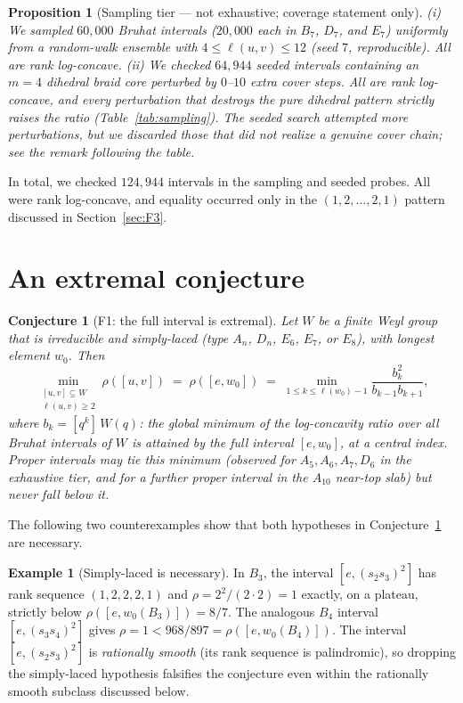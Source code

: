 \documentclass[11pt]{amsart}
\theoremstyle{plain}
\newtheorem{proposition}[theorem]{Proposition}
\newtheorem{conjecture}[theorem]{Conjecture}
\theoremstyle{definition}
\newtheorem{example}[theorem]{Example}
\theoremstyle{remark}
\newcommand{\W}{W}
\begin{document}
\begin{proposition}[Sampling tier --- not exhaustive; coverage statement only]
\label{thm:V3}
\textup{(i)} We sampled $60{,}000$ Bruhat intervals ($20{,}000$ each in
$B_7$, $D_7$, and $E_7$) uniformly from a random-walk ensemble with
$4\le\ell(u,v)\le 12$ (seed $7$, reproducible). All are rank
log-concave. \textup{(ii)} We checked $64{,}944$ seeded intervals
containing an $m=4$ dihedral braid core perturbed by $0$--$10$ extra cover
steps. All are rank log-concave, and every perturbation that destroys the
pure dihedral pattern strictly raises the ratio
(Table~\ref{tab:sampling}). The seeded search attempted more
perturbations, but we discarded those that did not realize a genuine cover
chain; see the remark following the table.
\end{proposition}

In total, we checked $124{,}944$ intervals in the sampling and seeded
probes. All were rank log-concave, and equality occurred only in the
$(1,2,\dots,2,1)$ pattern discussed in Section~\ref{sec:F3}.

\section{An extremal conjecture}
\label{sec:F1}

\begin{conjecture}[F1: the full interval is extremal]
\label{conj:F1}
Let $\W$ be a finite Weyl group that is \emph{irreducible} and
\emph{simply-laced} (type $A_n$, $D_n$, $E_6$, $E_7$, or $E_8$), with
longest element $w_0$. Then
\[
\min_{\substack{[u,v]\subseteq \W \\ \ell(u,v)\ge 2}} \rho([u,v])
\;=\; \rho([e,w_0])
\;=\; \min_{1\le k\le \ell(w_0)-1} \frac{b_k^2}{b_{k-1}b_{k+1}},
\]
where $b_k=[q^k]\,W(q)$: the global minimum of the log-concavity ratio over
\emph{all} Bruhat intervals of $\W$ is attained by the full interval
$[e,w_0]$, at a central index. Proper intervals may tie this minimum
(observed for $A_5,A_6,A_7,D_6$ in the exhaustive tier, and for a further
proper interval in the $A_{10}$ near-top slab) but never fall below it.
\end{conjecture}

The following two counterexamples show that both hypotheses in
Conjecture~\ref{conj:F1} are necessary.

\begin{example}[Simply-laced is necessary]
\label{ex:F1-simplylaced}
In $B_3$, the interval $[e,(s_2s_3)^2]$ has rank sequence $(1,2,2,2,1)$ and
$\rho=2^2/(2\cdot2)=1$ exactly, on a plateau, strictly below
$\rho([e,w_0(B_3)])=8/7$. The analogous $B_4$ interval
$[e,(s_3s_4)^2]$ gives $\rho=1<968/897=\rho([e,w_0(B_4)])$. The interval $[e,(s_2s_3)^2]$ is \emph{rationally smooth} (its rank
sequence is palindromic), so dropping the simply-laced hypothesis
falsifies the conjecture even within the rationally smooth subclass
discussed below.
\end{example}
\end{document}

